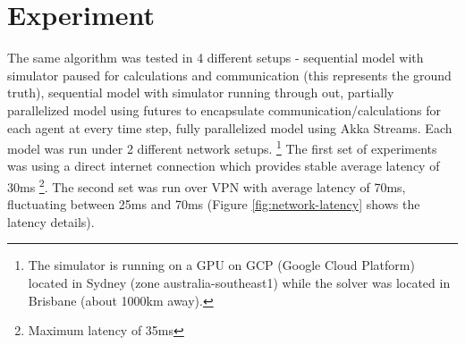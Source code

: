 \documentclass{article}
\begin{document}


%




\section{Experiment}
The same algorithm was tested in 4 different setups - sequential model with simulator paused for calculations and communication (this represents the ground truth), sequential model with simulator running through out, partially parallelized model using futures to encapsulate communication/calculations for each agent at every time step, fully parallelized model using Akka Streams. Each model was run under 2 different network setups. \footnote{The simulator is running on a GPU on GCP (Google Cloud Platform) located in Sydney (zone australia-southeast1) while the solver was located in Brisbane (about 1000km away).} The first set of experiments was using a direct internet connection which provides stable average latency of 30ms \footnote{Maximum latency of 35ms}. The second set was run over VPN with average latency of 70ms, fluctuating between 25ms and 70ms (Figure \ref{fig:network-latency} shows the latency details).
\end{document}

